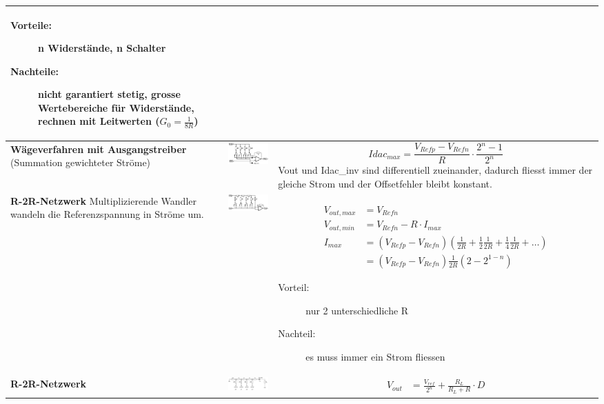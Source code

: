\begin{longtable}{|p{3cm}|c|p{8.6cm}|}
	  \begin{description}
  		\item[Vorteile:] n Widerstände, n Schalter
  		\item[Nachteile:] nicht garantiert stetig, grosse Wertebereiche für Widerstände, rechnen mit Leitwerten ($G_0 = \frac{1}{8R}$)
	  \end{description}
	\\ \hline
	\textbf{Wägeverfahren mit Ausgangstreiber} \newline
  (Summation gewichteter Ströme)
	& \includegraphics[width=5cm, valign=t]{./images/praktisch.png}
	& \[ Idac_{max}=\frac{V_{Refp}-V_{Refn}}{R} \cdot \frac{2^n-1}{2^n} \] \newline
    Vout und Idac\_inv sind differentiell zueinander, dadurch fliesst immer der gleiche Strom
    und der Offsetfehler bleibt konstant.
	\\ \hline
	\textbf{R-2R-Netzwerk \hartl{462}} Multiplizierende Wandler wandeln die Referenzspannung in Ströme um.
	& \includegraphics[width=5.5cm, valign=t]{./images/r2rnetzwerk.png}
	& {
	\begin{align*}
		V_{out,max} &= V_{Refn} \\
		V_{out,min} &= V_{Refn} - R \cdot I_{max}\\
		I_{max}		&= (V_{Refp} - V_{Refn}) (\frac{1}{2R} + \frac{1}{2}\frac{1}{2R} + \frac{1}{4} \frac{1}{2R} + \ldots) \\
					&= (V_{Refp} - V_{Refn})\frac{1}{2R}(2-2^{1-n})
	\end{align*}}
  
  \begin{description}
    \item[Vorteil:] nur 2 unterschiedliche R
    \item[Nachteil:] es muss immer ein Strom fliessen
  \end{description}
  
	\\ \hline
	\textbf{R-2R-Netzwerk}
	& \includegraphics[width=5cm, valign=t]{images/r2r.png}
	& {
	\begin{align*}
		V_{out}&= \frac{V_{ref}}{2^n} + \frac{R_L}{R_L + R} \cdot D
	\end{align*}}
  

\end{longtable}
